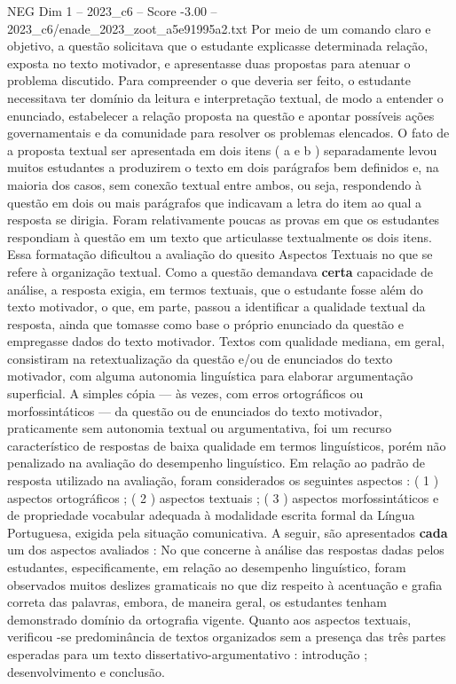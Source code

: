 \begin{textsample}{NEG Dim 1 – 2023\_c6 – Score -3.00 – 2023\_c6/enade\_2023\_zoot\_a5e91995a2.txt}
Por meio de um comando claro e objetivo, a questão solicitava que o estudante explicasse determinada relação, exposta no texto motivador, e apresentasse duas propostas para atenuar o problema discutido.
Para compreender o que deveria ser feito, o estudante necessitava ter domínio da leitura e interpretação textual, de modo a entender o enunciado, estabelecer a relação proposta na questão e apontar possíveis ações governamentais e da comunidade para resolver os problemas elencados.
O fato de a proposta textual ser apresentada em dois itens ( a e b ) separadamente levou muitos estudantes a produzirem o texto em dois parágrafos bem definidos e, na maioria dos casos, sem conexão textual entre ambos, ou seja, respondendo à questão em dois ou mais parágrafos que indicavam a letra do item ao qual a resposta se dirigia.
Foram relativamente poucas as provas em que os estudantes respondiam à questão em um texto que articulasse textualmente os dois itens.
Essa formatação dificultou a avaliação do quesito Aspectos Textuais no que se refere à organização textual.
Como a questão demandava \textbf{certa} capacidade de análise, a resposta exigia, em termos textuais, que o estudante fosse além do texto motivador, o que, em parte, passou a identificar a qualidade textual da resposta, ainda que tomasse como base o próprio enunciado da questão e empregasse dados do texto motivador.
Textos com qualidade mediana, em geral, consistiram na retextualização da questão e/ou de enunciados do texto motivador, com alguma autonomia linguística para elaborar argumentação superficial.
A simples cópia — às vezes, com erros ortográficos ou morfossintáticos — da questão ou de enunciados do texto motivador, praticamente sem autonomia textual ou argumentativa, foi um recurso característico de respostas de baixa qualidade em termos linguísticos, porém não penalizado na avaliação do desempenho linguístico.
Em relação ao padrão de resposta utilizado na avaliação, foram considerados os seguintes aspectos : ( 1 ) aspectos ortográficos ; ( 2 ) aspectos textuais ; ( 3 ) aspectos morfossintáticos e de propriedade vocabular adequada à modalidade escrita formal da Língua Portuguesa, exigida pela situação comunicativa.
A seguir, são apresentados \textbf{cada} um dos aspectos avaliados : No que concerne à análise das respostas dadas pelos estudantes, especificamente, em relação ao desempenho linguístico, foram observados muitos deslizes gramaticais no que diz respeito à acentuação e grafia correta das palavras, embora, de maneira geral, os estudantes tenham demonstrado domínio da ortografia vigente.
Quanto aos aspectos textuais, verificou -se predominância de textos organizados sem a presença das três partes esperadas para um texto dissertativo-argumentativo : introdução ; desenvolvimento e conclusão.

\end{textsample}
